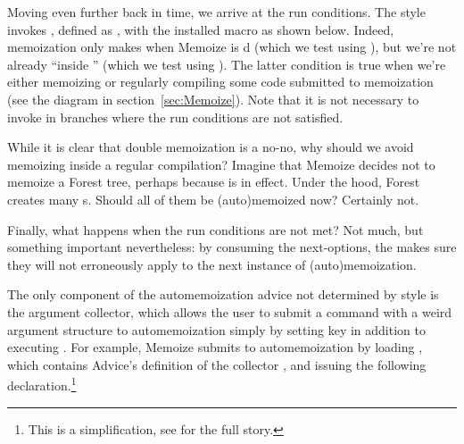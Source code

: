 \documentclass[a4paper,11pt]{article}
\begin{document}

Moving even further back in time, we arrive at the run conditions.  The
 style invokes ,
defined as , with
the installed macro as shown below.  Indeed, memoization only makes when
Memoize is d (which we test using ), but we're
not already ``inside '' (which we test using
).  The latter condition is true when we're either
memoizing or regularly compiling some code submitted to memoization (see the
diagram in section~\ref{sec:Memoize}).  Note that it is not necessary to invoke
 in branches where the run conditions are not satisfied.


While it is clear that double memoization is a no-no, why should we avoid
memoizing inside a regular compilation?  Imagine that Memoize decides not to
memoize a Forest tree, perhaps because  is in effect.  Under
the hood, Forest creates many s.  Should all of them be
(auto)memoized now? Certainly not.

Finally, what happens when the run conditions are not met?  Not much, but
something important nevertheless: by consuming the next-options, the
 makes sure they will not erroneously apply to the
next instance of (auto)memoization.


The only component of the automemoization advice not determined by style
 is the argument collector, which allows the user to submit
a command with a weird argument structure to automemoization simply by setting
key  in addition to executing .  For
example, Memoize submits  to automemoization by loading
, which contains Advice's definition of the
 collector , and issuing the
following declaration.\footnote{This is a simplification, see
   for the full story.}
\end{document}
